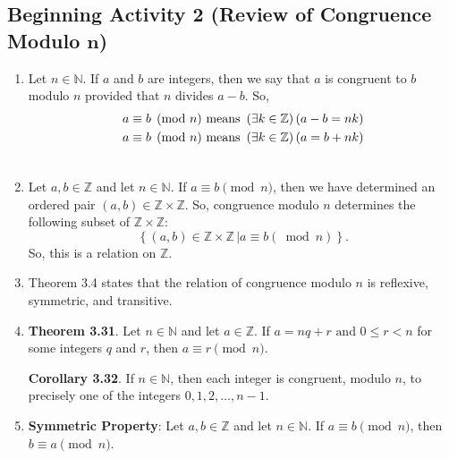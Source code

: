 \documentclass[11pt]{article}
\begin{document}
\newpage
\noindent
\subsection*{Beginning Activity 2 (Review of Congruence Modulo $\boldsymbol{n}$)}
\begin{enumerate}
\item Let  $n \in \mathbb{N}$.  If  $a$  and  $b$  are integers, then we say that  $a$  is congruent to  $b$  modulo  $n$  provided that  $n$  divides  $a - b$.  So,
\begin{align} \notag
  a &\equiv b \pmod n \text{  means  } \left( {\exists k \in \mathbb{Z}} \right)\left( {a - b = nk} \right) \\ \notag
  a &\equiv b \pmod n \text{  means  } \left( {\exists k \in \mathbb{Z}} \right)\left( {a = b + nk} \right) \\ \notag
\end{align}

\item Let  $a, b \in \mathbb{Z}$ and let  $n \in \mathbb{N}$.  If  $a \equiv b \pmod n$, then we have determined an ordered pair  $\left( {a, b} \right) \in \mathbb{Z} \times \mathbb{Z}$.  So, congruence modulo  $n$  determines the following subset of  $\mathbb{Z} \times \mathbb{Z}$:
\[
\left\{ {\left. {\left( {a, b} \right) \in \mathbb{Z} \times \mathbb{Z}\,} \right| a \equiv b\left( {\bmod n} \right)} \right\}.
\]
So, this is a relation on  $\mathbb{Z}$.

\item Theorem 3.4  states that the relation of congruence modulo  $n$  is reflexive, symmetric, and transitive. 

\item \textbf{Theorem 3.31}.  Let  $n \in \mathbb{N}$ and let  $a \in \mathbb{Z}$.  If  
$a = nq + r\text{  and  }0 \leqslant r < n$ for some integers  $q$  and  $r$, then  
$a \equiv r \pmod n$.

\textbf{Corollary 3.32}.  If  $n \in \mathbb{N}$, then each integer is congruent, modulo $n$, to precisely one of the integers $0, 1, 2,  \ldots , n - 1$.

\item \textbf{Symmetric Property}: Let  $a, b \in \mathbb{Z}$ and let  $n \in \mathbb{N}$.  If  
$a \equiv b \pmod n$, then  $b \equiv a \pmod n$.


\end{enumerate}
\end{document}
